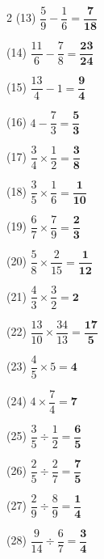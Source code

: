 \documentclass[a4paper, 11pt]{ltjsarticle}
\begin{document}
\begin{multicols*}{2}
\noindent (13) \quad $\dfrac{5}{9}-\dfrac{1}{6} = \mathbf{\dfrac{7}{18}}$
\vspace*{\fill}

\noindent (14) \quad $\dfrac{11}{6}-\dfrac{7}{8} = \mathbf{\dfrac{23}{24}}$
\vspace*{\fill}

\noindent (15) \quad $\dfrac{13}{4}-1 = \mathbf{\dfrac{9}{4}}$
\vspace*{\fill}

\noindent (16) \quad $4-\dfrac{7}{3} = \mathbf{\dfrac{5}{3}}$
\vspace*{\fill}
\columnbreak

\noindent (17) \quad $\dfrac{3}{4}\times\dfrac{1}{2} = \mathbf{\dfrac{3}{8}}$
\vspace*{\fill}

\noindent (18) \quad $\dfrac{3}{5}\times\dfrac{1}{6} = \mathbf{\dfrac{1}{10}}$
\vspace*{\fill}

\noindent (19) \quad $\dfrac{6}{7}\times\dfrac{7}{9} = \mathbf{\dfrac{2}{3}}$
\vspace*{\fill}

\noindent (20) \quad $\dfrac{5}{8}\times\dfrac{2}{15} = \mathbf{\dfrac{1}{12}}$
\vspace*{\fill}

\noindent (21) \quad $\dfrac{4}{3}\times\dfrac{3}{2} = \mathbf{2}$
\vspace*{\fill}

\noindent (22) \quad $\dfrac{13}{10}\times\dfrac{34}{13} = \mathbf{\dfrac{17}{5}}$
\vspace*{\fill}

\noindent (23) \quad $\dfrac{4}{5}\times5 = \mathbf{4}$
\vspace*{\fill}

\noindent (24) \quad $4\times\dfrac{7}{4} = \mathbf{7}$
\vspace*{\fill}
\columnbreak

\noindent (25) \quad $\dfrac{3}{5}\div\dfrac{1}{2} = \mathbf{\dfrac{6}{5}}$
\vspace*{\fill}

\noindent (26) \quad $\dfrac{2}{5}\div\dfrac{2}{7} = \mathbf{\dfrac{7}{5}}$
\vspace*{\fill}

\noindent (27) \quad $\dfrac{2}{9}\div\dfrac{8}{9} = \mathbf{\dfrac{1}{4}}$
\vspace*{\fill}

\noindent (28) \quad $\dfrac{9}{14}\div\dfrac{6}{7} = \mathbf{\dfrac{3}{4}}$
\vspace*{\fill}


\end{multicols*}
\end{document}
